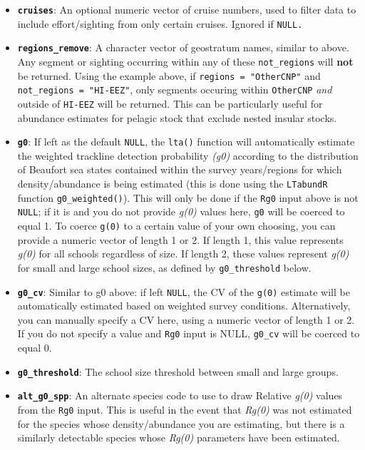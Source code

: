 \documentclass[
]{book}
\begin{document}
\begin{itemize}
\item
  \textbf{\texttt{cruises}}: An optional numeric vector of cruise numbers, used to filter data to include effort/sighting from only certain cruises. Ignored if \texttt{NULL.}
\item
  \textbf{\texttt{regions\_remove}}: A character vector of geostratum names, similar to above. Any segment or sighting occurring within any of these \texttt{not\_regions} will \textbf{not} be returned. Using the example above, if \texttt{regions\ =\ "OtherCNP"} and \texttt{not\_regions\ =\ "HI-EEZ"}, only segments occuring within \texttt{OtherCNP} \emph{and} outside of \texttt{HI-EEZ} will be returned. This can be particularly useful for abundance estimates for pelagic stock that exclude nested insular stocks.
\item
  \textbf{\texttt{g0}}: If left as the default \texttt{NULL}, the \texttt{lta()} function will automatically estimate the weighted trackline detection probability \emph{(g0)} according to the distribution of Beaufort sea states contained within the survey years/regions for which density/abundance is being estimated (this is done using the \texttt{LTabundR} function \texttt{g0\_weighted()}). This will only be done if the \texttt{Rg0} input above is not \texttt{NULL}; if it is and you do not provide \emph{g(0)} values here, \texttt{g0} will be coerced to equal 1. To coerce \texttt{g(0)} to a certain value of your own choosing, you can provide a numeric vector of length 1 or 2. If length 1, this value represents \emph{g(0)} for all schools regardless of size. If length 2, these values represent \emph{g(0)} for small and large school sizes, as defined by \texttt{g0\_threshold} below.
\item
  \textbf{\texttt{g0\_cv}}: Similar to g0 above: if left \texttt{NULL}, the CV of the \texttt{g(0)} estimate will be automatically estimated based on weighted survey conditions. Alternatively, you can manually specify a CV here, using a numeric vector of length 1 or 2. If you do not specify a value and \texttt{Rg0} input is NULL, \texttt{g0\_cv} will be coerced to equal 0.
\item
  \textbf{\texttt{g0\_threshold}}: The school size threshold between small and large groups.
\item
  \textbf{\texttt{alt\_g0\_spp}}: An alternate species code to use to draw Relative \emph{g(0)} values from the \texttt{Rg0} input. This is useful in the event that \emph{Rg(0)} was not estimated for the species whose density/abundance you are estimating, but there is a similarly detectable species whose \emph{Rg(0)} parameters have been estimated.

\end{itemize}
\end{document}
